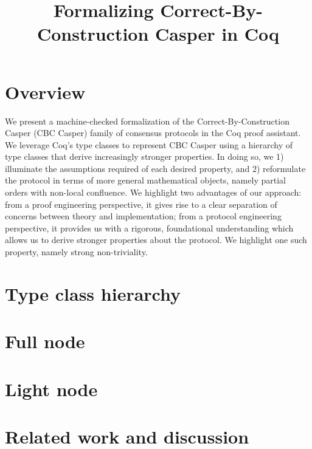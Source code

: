 \documentclass[runningheads]{llncs}
\begin{document}
	
\title{Formalizing Correct-By-Construction Casper in Coq}


\maketitle

\section{Overview}

We present a machine-checked formalization of the Correct-By-Construction Casper (CBC Casper) family of consensus protocols in the Coq proof assistant. We leverage Coq's type classes to represent CBC Casper using a hierarchy of type classes that derive increasingly stronger properties. In doing so, we 1) illuminate the assumptions required of each desired property, and 2) reformulate the protocol in terms of more general mathematical objects, namely partial orders with non-local confluence. We highlight two advantages of our approach: from a proof engineering perspective, it gives rise to a clear separation of concerns between theory and implementation; from a protocol engineering perspective, it provides us with a rigorous, foundational understanding which allows us to derive stronger properties about the protocol. We highlight one such property, namely strong non-triviality. 

\section{Type class hierarchy} 
\label{sec:typeclass}


\section{Full node} 
\label{sec:full}


\section{Light node}
\label{sec:light}


\section{Related work and discussion}
\label{sec:related}

\end{document}
